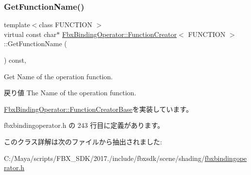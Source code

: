 \subsubsection{\texorpdfstring{Get\+Function\+Name()}{GetFunctionName()}}
{\footnotesize\ttfamily template$<$class F\+U\+N\+C\+T\+I\+ON $>$ \\
virtual const char$\ast$ \hyperlink{class_fbx_binding_operator_1_1_function_creator}{Fbx\+Binding\+Operator\+::\+Function\+Creator}$<$ F\+U\+N\+C\+T\+I\+ON $>$\+::Get\+Function\+Name (\begin{DoxyParamCaption}{ }\end{DoxyParamCaption}) const\hspace{0.3cm}{\ttfamily [inline]}, {\ttfamily [virtual]}}

Get Name of the operation function. \begin{DoxyReturn}{戻り値}
The Name of the operation function. 
\end{DoxyReturn}


\hyperlink{class_fbx_binding_operator_1_1_function_creator_base_a7a5ec0f9c376ce88b12cbfe171498913}{Fbx\+Binding\+Operator\+::\+Function\+Creator\+Base}を実装しています。



 fbxbindingoperator.\+h の 243 行目に定義があります。



このクラス詳解は次のファイルから抽出されました\+:\begin{DoxyCompactItemize}
\item 
C\+:/\+Maya/scripts/\+F\+B\+X\+\_\+\+S\+D\+K/2017./include/fbxsdk/scene/shading/\hyperlink{fbxbindingoperator_8h}{fbxbindingoperator.\+h}\end{DoxyCompactItemize}
